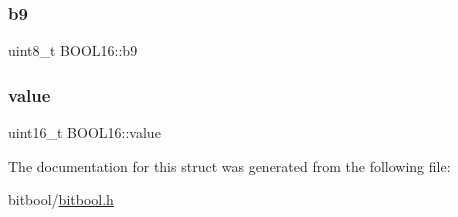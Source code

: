 \hypertarget{struct_b_o_o_l16_ae8e1fcafd82cc0d4490a39185af124c1}{}\label{struct_b_o_o_l16_ae8e1fcafd82cc0d4490a39185af124c1} 
\subsubsection{\texorpdfstring{b9}{b9}}
{\footnotesize\ttfamily uint8\+\_\+t B\+O\+O\+L16\+::b9}

\hypertarget{struct_b_o_o_l16_a2f59e7d314cbefe127529184abd1fbb7}{}\label{struct_b_o_o_l16_a2f59e7d314cbefe127529184abd1fbb7} 
\subsubsection{\texorpdfstring{value}{value}}
{\footnotesize\ttfamily uint16\+\_\+t B\+O\+O\+L16\+::value}



The documentation for this struct was generated from the following file\+:\begin{DoxyCompactItemize}
\item 
bitbool/\hyperlink{bitbool_8h}{bitbool.\+h}\end{DoxyCompactItemize}
